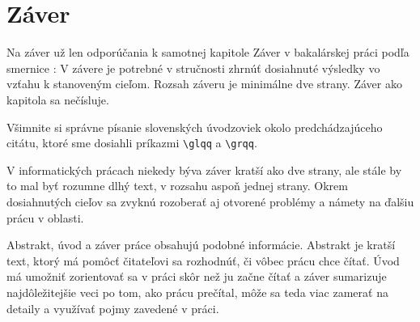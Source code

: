 \chapter*{Záver}  %

Na záver už len odporúčania k samotnej kapitole Záver v bakalárskej
práci podľa smernice \cite{smernica}:  \glqq{}V závere je potrebné v
stručnosti zhrnúť dosiahnuté výsledky vo vzťahu k stanoveným
cieľom. Rozsah záveru je minimálne dve strany. Záver ako kapitola sa
nečísluje.\grqq{}

Všimnite si správne písanie slovenských úvodzoviek okolo
predchádzajúceho citátu, ktoré sme dosiahli príkazmi \verb'\glqq' a
\verb'\grqq'.

V informatických prácach niekedy býva záver kratší ako dve strany, ale
stále by to mal byť rozumne dlhý text, v rozsahu aspoň jednej strany.
Okrem dosiahnutých cieľov sa zvyknú rozoberať aj otvorené problémy a
námety na ďalšiu prácu v oblasti.

Abstrakt, úvod a záver práce obsahujú podobné informácie. Abstrakt je
kratší text, ktorý má pomôcť čitateľovi sa rozhodnúť, či vôbec prácu
chce čítať. Úvod má umožniť zorientovať sa v práci skôr než ju začne
čítať a záver sumarizuje najdôležitejšie veci po tom, ako prácu
prečítal, môže sa teda viac zamerať na detaily a využívať pojmy
zavedené v práci.






